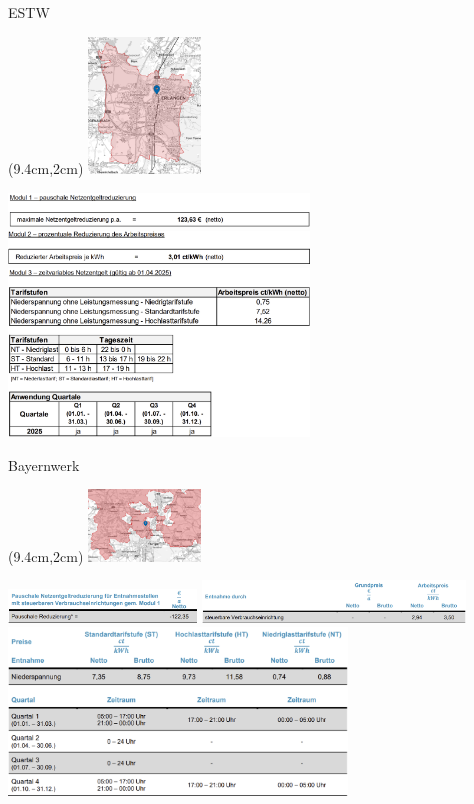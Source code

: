 \begin{frame}{ESTW}
   \begin{textblock*}{3.3cm}(9.4cm,2cm)
      \includegraphics[width=3cm]{images/Karte_ESTW.png}
   \end{textblock*}
   \includegraphics[width=8cm]{images/ESTW-Modul1.png}
   \includegraphics[width=8cm]{images/ESTW-Modul2.png}
   \includegraphics[width=8cm]{images/ESTW-Modul3.png}
\end{frame}

\begin{frame}{Bayernwerk}
   \begin{textblock*}{3.3cm}(9.4cm,2cm)
      \includegraphics[width=3cm]{images/Karte_Bayernwerk.png}
   \end{textblock*}
   \includegraphics[width=5cm]{images/Bayernwerk-Modul1.png}
   \includegraphics[width=7cm]{images/Bayernwerk-Modul2.png}
   \includegraphics[width=9cm]{images/Bayernwerk-Modul3.png}
\end{frame}

